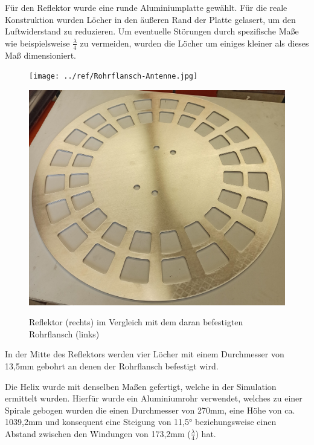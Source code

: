 Für den Reflektor wurde eine runde Aluminiumplatte gewählt. Für die reale Konstruktion wurden Löcher in den äußeren Rand der Platte gelasert, um den Luftwiderstand zu reduzieren. Um eventuelle Störungen durch spezifische Maße wie beispielsweise $\frac{\lambda}{4}$ zu vermeiden, wurden die Löcher um einiges kleiner als dieses Maß dimensioniert.

\begin{figure}[H]
	\begin{minipage}[b]{.4\linewidth} %
		\texttt{[image: ../ref/Rohrflansch-Antenne.jpg]}
		\label{fig:Rohrflansch-Antenne-Verbindung}
	\end{minipage}
	\hspace{.1\linewidth}%
	\begin{minipage}[b]{.4\linewidth} %
		\includegraphics[width=\linewidth]{../ref/Reflektor.jpg}
		\label{fig:Reflektor}
	\end{minipage}
	\caption{Reflektor (rechts) im Vergleich mit dem daran befestigten Rohrflansch (links)}
\end{figure}

In der Mitte des Reflektors werden vier Löcher mit einem Durchmesser von 13,5mm gebohrt an denen der Rohrflansch befestigt wird. 

Die Helix wurde mit denselben Maßen gefertigt, welche in der Simulation ermittelt wurden. Hierfür wurde ein Aluminiumrohr verwendet, welches zu einer Spirale gebogen wurden die einen Durchmesser von 270mm, eine Höhe von ca. 1039,2mm und konsequent eine Steigung von 11,5° beziehungsweise einen Abstand zwischen den Windungen von 173,2mm ($\frac{\lambda}{4}$) hat.

